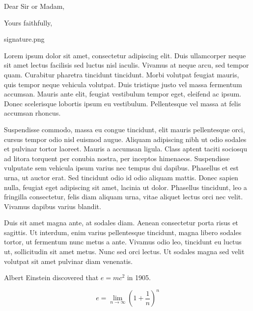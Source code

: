 \documentclass[11pt,a4paper,sans]{moderncv}        %
\begin{document}
\clearpage
\date{January 01, 1984}
\subject{Job application}
\opening{Dear Sir or Madam,}
\closing{Yours faithfully,}
\signature{0.9}{signature.png}                     %
\makelettertitle

Lorem ipsum dolor sit amet, consectetur adipiscing elit. Duis ullamcorper neque sit amet lectus facilisis sed luctus nisl iaculis. Vivamus at neque arcu, sed tempor quam. Curabitur pharetra tincidunt tincidunt. Morbi volutpat feugiat mauris, quis tempor neque vehicula volutpat. Duis tristique justo vel massa fermentum accumsan. Mauris ante elit, feugiat vestibulum tempor eget, eleifend ac ipsum. Donec scelerisque lobortis ipsum eu vestibulum. Pellentesque vel massa at felis accumsan rhoncus.

Suspendisse commodo, massa eu congue tincidunt, elit mauris pellentesque orci, cursus tempor odio nisl euismod augue. Aliquam adipiscing nibh ut odio sodales et pulvinar tortor laoreet. Mauris a accumsan ligula. Class aptent taciti sociosqu ad litora torquent per conubia nostra, per inceptos himenaeos. Suspendisse vulputate sem vehicula ipsum varius nec tempus dui dapibus. Phasellus et est urna, ut auctor erat. Sed tincidunt odio id odio aliquam mattis. Donec sapien nulla, feugiat eget adipiscing sit amet, lacinia ut dolor. Phasellus tincidunt, leo a fringilla consectetur, felis diam aliquam urna, vitae aliquet lectus orci nec velit. Vivamus dapibus varius blandit.

Duis sit amet magna ante, at sodales diam. Aenean consectetur porta risus et sagittis. Ut interdum, enim varius pellentesque tincidunt, magna libero sodales tortor, ut fermentum nunc metus a ante. Vivamus odio leo, tincidunt eu luctus ut, sollicitudin sit amet metus. Nunc sed orci lectus. Ut sodales magna sed velit volutpat sit amet pulvinar diam venenatis.

Albert Einstein discovered that $e=mc^2$ in 1905.

\[ e=\lim_{n \to \infty} \left(1+\frac{1}{n}\right)^n \]

\makeletterclosing

\end{document}
